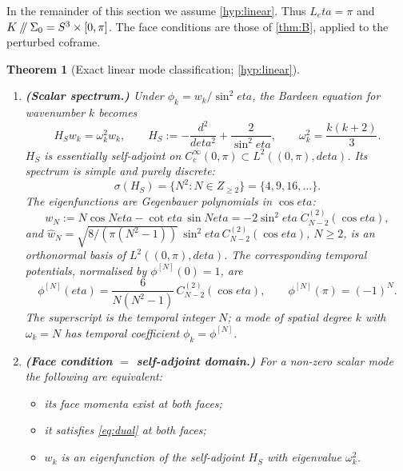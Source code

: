 \documentclass[11pt]{article}
\theoremstyle{canonmath}
\theoremstyle{canonpostulate}
\theoremstyle{canonproposition}
\theoremstyle{canonmath}
\newtheorem{mainthm}{Theorem}
\theoremstyle{canonproposition}
\providecommand{\cutK}{\Klein\mathbin{/\mkern-5mu/}\Sigma_0}
\providecommand{\Klein}{\mathcal{K}}
\providecommand{\Z}{\mathbb{Z}}
\def\mathbb#1{#1}%
\def\mathcal#1{#1}%
\def\eta{eta}%
\begin{document}
In the remainder of this section we assume \ref{hyp:linear}. Thus $L_\eta = \pi$ and $\cutK = S^3\times[0,\pi]$. The face conditions are those of \cref{thm:B}, applied to the perturbed coframe.

\begin{mainthm}[Exact linear mode classification; \ref{hyp:linear}]\label{thm:D}
\leavevmode
\begin{enumerate}[label=(\alph*)]
\item \textbf{(Scalar spectrum.)} Under $\phi_k = w_k/\sin^2\eta$, the Bardeen equation for wavenumber $k$ becomes
\begin{equation}
\mathcal{H}_S w_k = \omega_k^2 w_k, \qquad \mathcal{H}_S := -\frac{d^2}{d\eta^2} + \frac{2}{\sin^2\eta}, \qquad \omega_k^2 = \frac{k(k+2)}{3}.
\label{eq:pt}
\end{equation}
$\mathcal{H}_S$ is essentially self-adjoint on $C_c^\infty(0,\pi)\subset L^2((0,\pi),d\eta)$. Its spectrum is simple and purely discrete:
\begin{equation}
\sigma(\mathcal{H}_S) = \{N^2 : N\in\Z_{\ge2}\} = \{4, 9, 16, \dots\}.
\label{eq:spec}
\end{equation}
The eigenfunctions are Gegenbauer polynomials in $\cos\eta$:
\begin{equation}
w_N := N\cos N\eta - \cot\eta\,\sin N\eta = -2\sin^2\eta\;C^{(2)}_{N-2}(\cos\eta),
\label{eq:darboux}
\end{equation}
and $\hat w_N = \sqrt{8/(\pi(N^2-1))}\,\sin^2\eta\,C^{(2)}_{N-2}(\cos\eta)$, $N\ge2$, is an orthonormal basis of $L^2((0,\pi),d\eta)$. The corresponding temporal potentials, normalised by $\phi^{[N]}(0) = 1$, are
\begin{equation}
\phi^{[N]}(\eta) = \frac{6}{N(N^2-1)}\,C^{(2)}_{N-2}(\cos\eta), \qquad \phi^{[N]}(\pi) = (-1)^N.
\label{eq:phiN}
\end{equation}
The superscript is the temporal integer $N$; a mode of spatial degree $k$ with $\omega_k = N$ has temporal coefficient $\phi_k = \phi^{[N]}$.
\item \textbf{(Face condition $=$ self-adjoint domain.)} For a non-zero scalar mode the following are equivalent:
  \begin{itemize}
  \item its face momenta exist at both faces;
  \item it satisfies \eqref{eq:dual} at both faces;
  \item $w_k$ is an eigenfunction of the self-adjoint $\mathcal{H}_S$ with eigenvalue $\omega_k^2$.
  \end{itemize}

\end{enumerate}
\end{mainthm}
\end{document}
